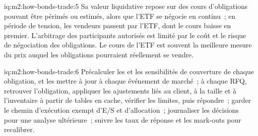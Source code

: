 \begin{solution}{iq:m2:how-bonds-trade:5}
Sa valeur liquidative repose sur des cours d'obligations pouvant être périmés ou estimés, alors que
l'ETF se négocie en continu~; en période de tension, les vendeurs passent par l'ETF, dont le cours baisse en premier.
L'arbitrage des participants autorisés est limité par le coût et le risque de négociation des
obligations. Le cours de l'ETF est souvent la meilleure mesure du prix auquel les obligations pourraient
réellement se vendre.
\end{solution}

\begin{solution}{iq:m2:how-bonds-trade:6}
Précalculer les  et les sensibilités de couverture de chaque obligation, et les mettre à jour à
chaque événement de marché~; à chaque RFQ, retrouver l'obligation, appliquer les ajustements liés au client, à la taille et à l'inventaire
à partir de tables en cache, vérifier les limites, puis répondre~; garder le chemin d'exécution exempt d'E/S
et d'allocation~; journaliser les décisions pour une analyse ultérieure~; suivre les taux de réponse et les mark-outs pour
recalibrer.
\end{solution}
